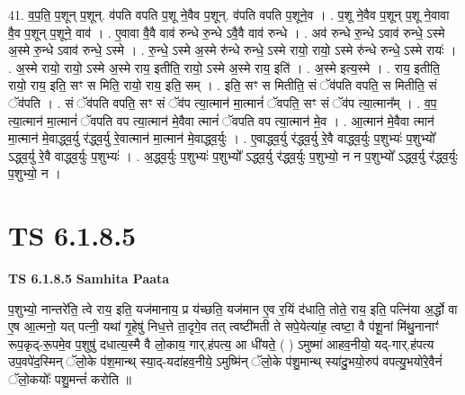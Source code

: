 \documentclass[17pt]{extarticle}
\begin{document}
41. व॒प॒ति॒ प॒शून् प॒शून्. व॑पति वपति प॒शू ने॒वैव प॒शून्. व॑पति वपति प॒शूने॒व । . प॒शू ने॒वैव प॒शून् प॒शू ने॒वावा वै॒व प॒शून् प॒शूने॒ वाव॑ । . ए॒वावा वै॒वै वाव॑ रुन्धे रु॒न्धे ऽवै॒वै वाव॑ रुन्धे । . अव॑ रुन्धे रु॒न्धे ऽवाव॑ रुन्धे॒ ऽस्मे अ॒स्मे रु॒न्धे ऽवाव॑ रुन्धे॒ ऽस्मे । . रु॒न्धे॒ ऽस्मे अ॒स्मे रु॑न्धे रुन्धे॒ ऽस्मे रायो॒ रायो॒ ऽस्मे रु॑न्धे रुन्धे॒ ऽस्मे रायः॑ । . अ॒स्मे रायो॒ रायो॒ ऽस्मे अ॒स्मे राय॒ इतीति॒ रायो॒ ऽस्मे अ॒स्मे राय॒ इति॑ । . अ॒स्मे इत्य॒स्मे । . राय॒ इतीति॒ रायो॒ राय॒ इति॒ सꣳ स मिति॒ रायो॒ राय॒ इति॒ सम् । . इति॒ सꣳ स मितीति॒ सं ॅव॑पति वपति॒ स मितीति॒ सं ॅव॑पति । . सं ॅव॑पति वपति॒ सꣳ सं ॅव॑प त्या॒त्मान॑ मा॒त्मानं॑ ॅवपति॒ सꣳ सं ॅव॑प त्या॒त्मान᳚म् । . व॒प॒ त्या॒त्मान॑ मा॒त्मानं॑ ॅवपति वप त्या॒त्मान॑ मे॒वैवा त्मानं॑ ॅवपति वप त्या॒त्मान॑ मे॒व । . आ॒त्मान॑ मे॒वैवा त्मान॑ मा॒त्मान॑ मे॒वाद्ध्व॒र्यु र॑द्ध्व॒र्यु रे॒वात्मान॑ मा॒त्मान॑ मे॒वाद्ध्व॒र्युः । . ए॒वाद्ध्व॒र्यु र॑द्ध्व॒र्यु रे॒वै वाद्ध्व॒र्युः प॒शुभ्यः॑ प॒शुभ्यो᳚ ऽद्ध्व॒र्यु रे॒वै वाद्ध्व॒र्युः प॒शुभ्यः॑ । . अ॒द्ध्व॒र्युः प॒शुभ्यः॑ प॒शुभ्यो᳚ ऽद्ध्व॒र्यु र॑द्ध्व॒र्युः प॒शुभ्यो॒ न न प॒शुभ्यो᳚ ऽद्ध्व॒र्यु र॑द्ध्व॒र्युः प॒शुभ्यो॒ न । \newline
\pagebreak
{}

\section{ TS 6.1.8.5 }

\textbf{TS 6.1.8.5 } \newline
\textbf{Samhita Paata} \newline

प॒शुभ्यो॒ नान्तरे॑ति॒ त्वे राय॒ इति॒ यज॑मानाय॒ प्र य॑च्छति॒ यज॑मान ए॒व र॒यिं द॑धाति॒ तोते॒ राय॒ इति॒ पत्नि॑या अ॒र्द्धो वा ए॒ष आ॒त्मनो॒ यत् पत्नी॒ यथा॑ गृ॒हेषु॑ निध॒त्ते ता॒दृगे॒व तत् त्वष्टी॑मती ते सपे॒येत्या॑ह॒ त्वष्टा॒ वै प॑शू॒नां मि॑थु॒नानाꣳ॑ रूप॒कृद्-रू॒पमे॒व प॒शुषु॑ दधात्य॒स्मै वै लो॒काय॒ गार्.ह॑पत्य॒ आ धी॑यते॒ ( ) ऽमुष्मा॑ आहव॒नीयो॒ यद्-गार्.ह॑पत्य उप॒वपे॑द॒स्मिन् ॅलो॒के प॑श॒मान्थ् स्या॒द्-यदा॑हव॒नीये॒ ऽमुष्मि॑न् ॅलो॒के प॑शु॒मान्थ् स्या॑दु॒भयो॒रुप॑ वपत्यु॒भयो॑रे॒वैनं॑ ॅलो॒कयोः᳚ पशु॒मन्तं॑ करोति ॥ \newline
\end{document}
